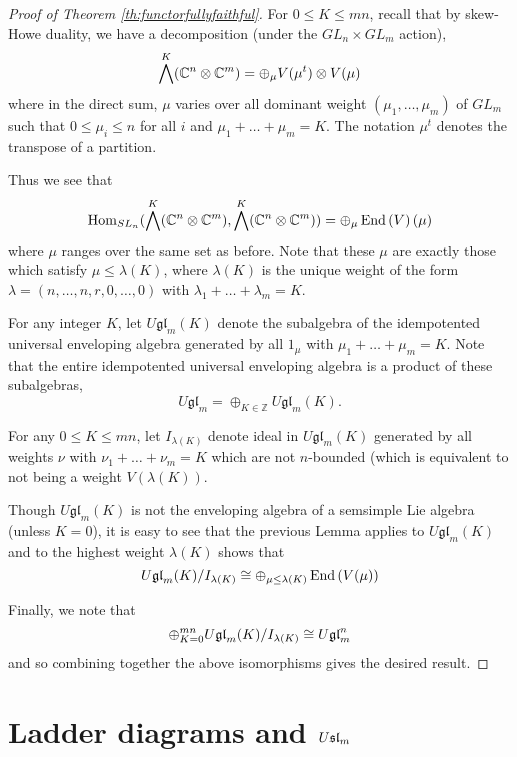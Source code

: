 \documentclass[11pt,leqno]{article}
\begin{document}
\begin{proof}[Proof of Theorem \ref{th:functorfullyfaithful}]
For $ 0 \le K \le mn $,  recall that by skew-Howe duality, we have a decomposition (under the $GL_n \times GL_m$ action),
$$
\bigwedge^K (\mathbb C^n \otimes \mathbb C^m) = \oplus_{\mu} V(\mu^t) \otimes V(\mu)
$$
where in the direct sum, $\mu $ varies over all dominant weight $ (\mu_1, \dots, \mu_m) $ of $ GL_m $ such that $ 0 \le \mu_i \le n $ for all $ i$  and $ \mu_1 + \dots + \mu_m = K $.  The notation $ \mu^t $ denotes the transpose of a partition.

Thus we see that
$$
\operatorname{Hom}_{SL_n} (\bigwedge^K(\mathbb C^n \otimes \mathbb C^m), \bigwedge^K(\mathbb C^n \otimes \mathbb C^m)) = 
\oplus_{\mu} \operatorname{End}\left(V\right)(\mu) 
$$
where $ \mu $ ranges over the same set as before.  Note that these $\mu $ are exactly those which satisfy $ \mu \le \lambda(K) $, where $ \lambda(K) $ is the unique weight of the form $\lambda =  (n, \dots, n, r, 0, \dots, 0) $ with $ \lambda_1 + \dots + \lambda_m = K $.

For any integer $ K $, let $ U \mathfrak{gl}_m(K) $ denote the subalgebra of the idempotented universal enveloping algebra generated by all $ 1_\mu $ with $ \mu_1 + \dots + \mu_m = K $.  Note that the entire idempotented universal enveloping algebra is a product of these subalgebras, 
$$
U \mathfrak{gl}_m = \oplus_{K \in \mathbb Z} U \mathfrak{gl}_m(K).
$$

For any $ 0 \le K \le mn $, let $ I_{\lambda(K)} $ denote ideal in $ U \mathfrak{gl}_m(K)$ generated by all weights $ \nu $ with $ \nu_1 + \dots + \nu_m = K $ which are not $ n$-bounded (which is equivalent to not being a weight $ V(\lambda(K)) $.

Though $ U\mathfrak{gl}_m(K) $ is not the enveloping algebra of a semsimple Lie algebra (unless $ K = 0 $), it is easy to see that the previous Lemma applies to $ U\mathfrak{gl}_m(K) $ and to the highest weight $\lambda(K) $ shows that
$$
U\mathfrak{gl}_m(K) / I_{\lambda(K)} \cong \oplus_{\mu \le \lambda(K)} \operatorname{End}\left(V(\mu)\right)
$$

Finally, we note that 
$$
\oplus_{K= 0}^{mn} U\mathfrak{gl}_m(K) / I_{\lambda(K)} \cong U\mathfrak{gl}_{m}^n 
$$
and so combining together the above isomorphisms gives the desired result.

\end{proof} 

\section{Ladder diagrams and $U\mathfrak{sl}_{m}$}
\label{sec:ladders}
\end{document}

